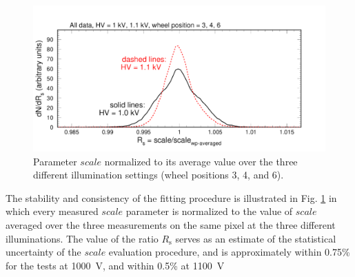 \begin{figure}[h!]
	\centering
	\includegraphics[width=0.98\linewidth, trim=0 12 50 35, clip]{figures/pglobal_Rs.pdf}
	\caption{Parameter $scale$ normalized to its average value over the three different illumination settings (wheel positions 3, 4, and 6).}
	\label{fig:pglobal_Rs}
\end{figure}
The stability and consistency of the fitting procedure is illustrated in Fig. \ref{fig:pglobal_Rs} in which every measured $scale$ parameter is normalized to the value of $scale$ averaged over the three measurements on the same pixel at the three different illuminations. The value of the ratio $R_{\mathrm{s}}$ serves as an estimate of the statistical uncertainty of the $scale$ evaluation procedure, and is approximately within 0.75\% for the tests at 1000~V, and within 0.5\% at 1100~V 

